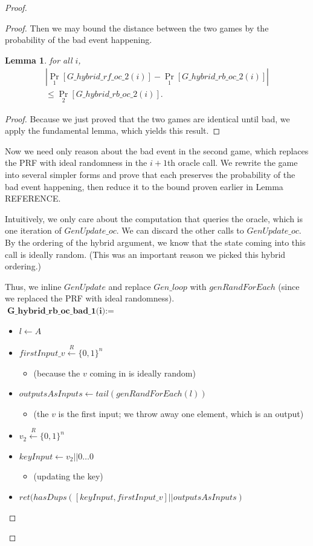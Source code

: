\documentclass[12pt,lot, lof]{puthesis}
\newenvironment{game}
{ \begin{itemize}[noitemsep,nolistsep] 
}
{ \end{itemize}                  }
\newcommand{\samp}{\xleftarrow{R} \{0,1\}}
\newcommand{\lar}{\leftarrow}
\newtheorem{lem}{Lemma}[thm]
\begin{document}
{\begin{proof}
\begin{proof}
Then we may bound the distance between the two games by the probability of the bad event happening.

\begin{lem} for all $i$,
\begin{gather*}
|\Pr_1[G\_hybrid\_rf\_oc\_2(i)] - \Pr_1[G\_hybrid\_rb\_oc\_2(i)] |
\\ \leq \Pr_2[G\_hybrid\_rb\_oc\_2(i)].
\end{gather*}
\end{lem}
\begin{proof}
Because we just proved that the two games are identical until bad, we apply the fundamental lemma, which yields this result. 
\end{proof}

Now we need only reason about the bad event in the second game, which replaces the PRF with ideal randomness in the $i+1$th oracle call. We rewrite the game into several simpler forms and prove that each preserves the probability of the bad event happening, then reduce it to the bound proven earlier in Lemma REFERENCE.

Intuitively, we only care about the computation that queries the oracle, which is one iteration of $GenUpdate\_oc$. We can discard the other calls to $GenUpdate\_oc$. By the ordering of the hybrid argument, we know that the state coming into this call is ideally random. (This was an important reason we picked this hybrid ordering.) 

Thus, we inline $GenUpdate$ and replace $Gen\_loop$ with $genRandForEach$ (since we replaced the PRF with ideal randomness). \\

$\textbf{G\_hybrid\_rb\_oc\_bad\_1(i)} := $
\begin{game}
\item[] $l \lar A$
\item[] $firstInput\_v \samp^n$ 
  \begin{game}
    \item[] (because the $v$ coming in is ideally random)
  \end{game}
\item[] $outputsAsInputs \lar tail(genRandForEach(l))$
  \begin{game}
    \item[] (the $v$ is the first input; we throw away one element, which is an output)
  \end{game}
\item[] $v_2 \samp^n$
\item[] $keyInput \lar v_2 || 0 \ldots 0$
  \begin{game}
    \item[] (updating the key)
  \end{game}
\item[] $ret(hasDups([keyInput, firstInput\_v] || outputsAsInputs)$ \\
\end{game}


\end{proof}
\end{proof}}
\end{document}

